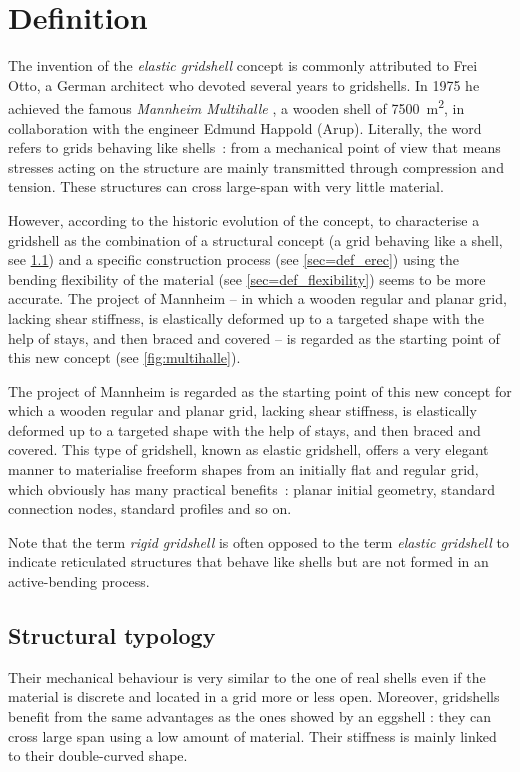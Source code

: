 \section{Definition}\label{sec=gsdef}

The invention of the \emph{elastic gridshell} concept is commonly attributed to Frei Otto, a German architect who devoted several years to gridshells. In 1975 he achieved the famous \emph{Mannheim Multihalle} \cite{Happold1975}, a wooden shell of 7500~m\textsuperscript{2}, in collaboration with the engineer Edmund Happold (Arup).
Literally, the word  refers to grids behaving like shells~: from a mechanical point of view that means stresses acting on the structure are mainly transmitted through compression and tension. These structures can cross large-span with very little material.

However, according to the historic evolution of the concept, to characterise a gridshell as the combination of a structural concept (a grid behaving like a shell, see \cref{sec=def_topo}) and a specific construction process (see \cref{sec=def_erec}) using the bending flexibility of the material (see \cref{sec=def_flexibility}) seems to be more accurate. The project of Mannheim -- in which a wooden regular and planar grid, lacking shear stiffness, is elastically deformed up to a targeted shape with the help of stays, and then braced and covered -- is regarded as the starting point of this new concept (see \cref{fig:multihalle}).

The project of Mannheim is regarded as the starting point of this new concept for which a wooden regular and planar grid, lacking shear stiffness, is elastically deformed up to a targeted shape with the help of stays, and then braced and covered. This type of gridshell, known as elastic gridshell, offers a very elegant manner to materialise freeform shapes from an initially flat and regular grid, which obviously has many practical benefits~: planar initial geometry, standard connection nodes, standard profiles and so on.

Note that the term \emph{rigid gridshell} is often opposed to the term \emph{elastic gridshell} to indicate reticulated structures that behave like shells but are not formed in an active-bending process.

\subsection{Structural typology}\label{sec=def_topo}
Their mechanical behaviour is very similar to the one of real shells even if the material is discrete and located in a grid more or less open. Moreover, gridshells benefit from the same advantages as the ones showed by an eggshell : they can cross large span using a low amount of material. Their stiffness is mainly linked to their double-curved shape.


